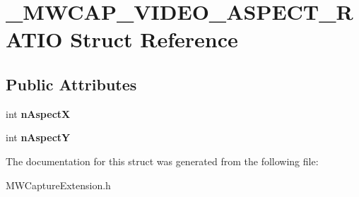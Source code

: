 \hypertarget{struct__MWCAP__VIDEO__ASPECT__RATIO}{\section{\-\_\-\-M\-W\-C\-A\-P\-\_\-\-V\-I\-D\-E\-O\-\_\-\-A\-S\-P\-E\-C\-T\-\_\-\-R\-A\-T\-I\-O Struct Reference}
\label{struct__MWCAP__VIDEO__ASPECT__RATIO}
}
\subsection*{Public Attributes}
\begin{DoxyCompactItemize}
\item 
\hypertarget{struct__MWCAP__VIDEO__ASPECT__RATIO_a1251578b748c0f80a7df4ae542151d70}{int {\bfseries n\-Aspect\-X}}\label{struct__MWCAP__VIDEO__ASPECT__RATIO_a1251578b748c0f80a7df4ae542151d70}

\item 
\hypertarget{struct__MWCAP__VIDEO__ASPECT__RATIO_a2029cc9404724a427a4da18a63bed861}{int {\bfseries n\-Aspect\-Y}}\label{struct__MWCAP__VIDEO__ASPECT__RATIO_a2029cc9404724a427a4da18a63bed861}

\end{DoxyCompactItemize}


The documentation for this struct was generated from the following file\-:\begin{DoxyCompactItemize}
\item 
M\-W\-Capture\-Extension.\-h\end{DoxyCompactItemize}
